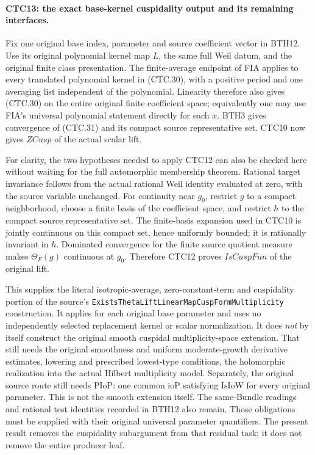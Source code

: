 \paragraph{CTC13: the exact base-kernel cuspidality output and its remaining interfaces.}
\label{claim:CTC13}
Fix one original base index, parameter and source coefficient
vector in BTH12.  Use its original polynomial kernel map $L$,
the same full Weil datum, and the original finite class presentation.
The finite-average endpoint of FIA applies to every translated
polynomial kernel in (CTC.30), with a positive period and one
averaging list independent of the polynomial.  Linearity therefore
also gives (CTC.30) on the entire original finite coefficient
space; equivalently one may use FIA's universal polynomial
statement directly for each $x$.  BTH3 gives convergence of
(CTC.31) and its compact source representative set.
CTC10 now gives $ZCusp$ of the actual scalar lift.

For clarity, the two hypotheses needed to apply CTC12 can also
be checked here without waiting for the full automorphic
membership theorem.  Rational target invariance follows from
the actual rational Weil identity evaluated at zero, with the
source variable unchanged.  For continuity near $g_0$, restrict
$g$ to a compact neighborhood, choose a finite basis of the
coefficient space, and restrict $h$ to the compact source
representative set.  The finite-basis expansion used in CTC10
is jointly continuous on this compact set, hence uniformly
bounded; it is rationally invariant in $h$.  Dominated convergence
for the finite source quotient measure makes $\Theta_F(g)$
continuous at $g_0$.  Therefore CTC12 proves $IsCuspFun$ of
the original lift.

This supplies the literal isotropic-average, zero-constant-term
and cuspidality portion of the source's
\texttt{ExistsThetaLiftLinearMapCuspFormMultiplicity} construction.
It applies for each original base parameter and uses no independently
selected replacement kernel or scalar normalization.  It does
\emph{not} by itself construct the original smooth cuspidal
multiplicity-space extension. That still needs the original
smoothness and uniform moderate-growth
derivative estimates, lowering and prescribed lowest-type conditions,
the holomorphic realization into the actual Hilbert multiplicity
model. Separately, the original source route still needs
$\mathrm{PIoP}$: one common $\mathrm{ioP}$ satisfying
$\mathrm{IsIoW}$ for every original parameter. This is not the
smooth extension itself. The same-Bundle readings and rational
test identities recorded in BTH12 also remain. Those obligations
must be supplied with their original universal parameter
quantifiers. The present result
removes the cuspidality subargument from that residual task; it
does not remove the entire producer leaf.



